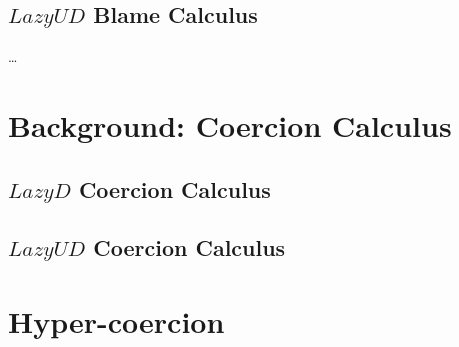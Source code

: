 \documentclass[acmsmall,review,anonymous]{acmart}\settopmatter{printfolios=true,printccs=false,printacmref=false}
\begin{document}
\subsection{$Lazy UD$ Blame Calculus}

\dots

\section{Background: Coercion Calculus}

\subsection{$Lazy D$ Coercion Calculus}

\subsection{$Lazy UD$ Coercion Calculus}

\section{Hyper-coercion} \label{sec:hyper-coercion}
\end{document}
